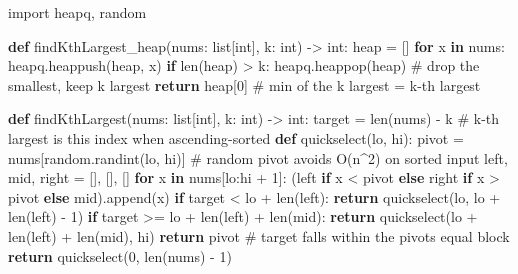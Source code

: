 \documentclass[11pt]{article}
\newenvironment{Shaded}{\begin{snugshade}}{\end{snugshade}}
\newcommand{\BuiltInTok}[1]{\textcolor[rgb]{0.50,0.55,0.55}{#1}}
\newcommand{\CommentTok}[1]{\textcolor[rgb]{0.48,0.49,0.49}{#1}}
\newcommand{\ControlFlowTok}[1]{\textcolor[rgb]{0.99,0.74,0.29}{\textbf{#1}}}
\newcommand{\DecValTok}[1]{\textcolor[rgb]{0.96,0.45,0.00}{#1}}
\newcommand{\ImportTok}[1]{\textcolor[rgb]{0.15,0.68,0.38}{#1}}
\newcommand{\KeywordTok}[1]{\textcolor[rgb]{0.81,0.81,0.76}{\textbf{#1}}}
\newcommand{\NormalTok}[1]{\textcolor[rgb]{0.81,0.81,0.76}{#1}}
\newcommand{\OperatorTok}[1]{\textcolor[rgb]{0.81,0.81,0.76}{#1}}
\begin{document}
\begin{Shaded}
\begin{Highlighting}[]
\ImportTok{import}\NormalTok{ heapq, random}

\KeywordTok{def}\NormalTok{ findKthLargest\_heap(nums: }\BuiltInTok{list}\NormalTok{[}\BuiltInTok{int}\NormalTok{], k: }\BuiltInTok{int}\NormalTok{) }\OperatorTok{{-}\textgreater{}} \BuiltInTok{int}\NormalTok{:}
\NormalTok{    heap }\OperatorTok{=}\NormalTok{ []}
    \ControlFlowTok{for}\NormalTok{ x }\KeywordTok{in}\NormalTok{ nums:}
\NormalTok{        heapq.heappush(heap, x)}
        \ControlFlowTok{if} \BuiltInTok{len}\NormalTok{(heap) }\OperatorTok{\textgreater{}}\NormalTok{ k:}
\NormalTok{            heapq.heappop(heap)    }\CommentTok{\# drop the smallest, keep k largest}
    \ControlFlowTok{return}\NormalTok{ heap[}\DecValTok{0}\NormalTok{]                 }\CommentTok{\# min of the k largest = k{-}th largest}

\KeywordTok{def}\NormalTok{ findKthLargest(nums: }\BuiltInTok{list}\NormalTok{[}\BuiltInTok{int}\NormalTok{], k: }\BuiltInTok{int}\NormalTok{) }\OperatorTok{{-}\textgreater{}} \BuiltInTok{int}\NormalTok{:}
\NormalTok{    target }\OperatorTok{=} \BuiltInTok{len}\NormalTok{(nums) }\OperatorTok{{-}}\NormalTok{ k         }\CommentTok{\# k{-}th largest is this index when ascending{-}sorted}
    \KeywordTok{def}\NormalTok{ quickselect(lo, hi):}
\NormalTok{        pivot }\OperatorTok{=}\NormalTok{ nums[random.randint(lo, hi)]   }\CommentTok{\# random pivot avoids O(n\^{}2) on sorted input}
\NormalTok{        left, mid, right }\OperatorTok{=}\NormalTok{ [], [], []}
        \ControlFlowTok{for}\NormalTok{ x }\KeywordTok{in}\NormalTok{ nums[lo:hi }\OperatorTok{+} \DecValTok{1}\NormalTok{]:}
\NormalTok{            (left }\ControlFlowTok{if}\NormalTok{ x }\OperatorTok{\textless{}}\NormalTok{ pivot }\ControlFlowTok{else}\NormalTok{ right }\ControlFlowTok{if}\NormalTok{ x }\OperatorTok{\textgreater{}}\NormalTok{ pivot }\ControlFlowTok{else}\NormalTok{ mid).append(x)}
        \ControlFlowTok{if}\NormalTok{ target }\OperatorTok{\textless{}}\NormalTok{ lo }\OperatorTok{+} \BuiltInTok{len}\NormalTok{(left):}
            \ControlFlowTok{return}\NormalTok{ quickselect(lo, lo }\OperatorTok{+} \BuiltInTok{len}\NormalTok{(left) }\OperatorTok{{-}} \DecValTok{1}\NormalTok{)}
        \ControlFlowTok{if}\NormalTok{ target }\OperatorTok{\textgreater{}=}\NormalTok{ lo }\OperatorTok{+} \BuiltInTok{len}\NormalTok{(left) }\OperatorTok{+} \BuiltInTok{len}\NormalTok{(mid):}
            \ControlFlowTok{return}\NormalTok{ quickselect(lo }\OperatorTok{+} \BuiltInTok{len}\NormalTok{(left) }\OperatorTok{+} \BuiltInTok{len}\NormalTok{(mid), hi)}
        \ControlFlowTok{return}\NormalTok{ pivot               }\CommentTok{\# target falls within the pivot\textquotesingle{}s equal block}
    \ControlFlowTok{return}\NormalTok{ quickselect(}\DecValTok{0}\NormalTok{, }\BuiltInTok{len}\NormalTok{(nums) }\OperatorTok{{-}} \DecValTok{1}\NormalTok{)}
\end{Highlighting}
\end{Shaded}
\end{document}
